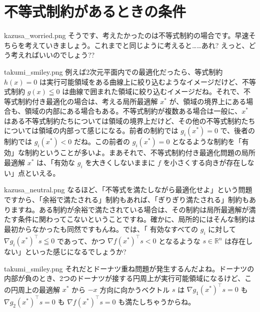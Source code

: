 \documentclass[b5paper,xelatex,ja=standard,10pt]{bxjsarticle}
\begin{document}
\renewcommand*{\mysectiontitle}{不等式制約があるときの条件}
\section*{\mysectiontitle}
\addcontentsline{toc}{section}{\mysectiontitle}
\vspace{3pt}

\begin{SERIFU}[colback=PaleIris, colbacktitle=PaleIris2]{kazusa_worried.png}
そうです、考えたかったのは不等式制約の場合です。早速そちらを考えていきましょう。これまでと同じように考えると……あれ? えっと、どう考えればいいのでしょう??
\end{SERIFU}

\begin{SERIFU}[colback=PaleGold, colbacktitle=PaleGold2]{takumi_smiley.png}
例えば2次元平面内での最適化だったら、等式制約 $h(x)=0$ は実行可能領域をある曲線上に絞り込むようなイメージだけど、不等式制約 $g(x) \leqq 0$ は曲線で囲まれた領域に絞り込むイメージだね。それで、不等式制約付き最適化の場合は、考える局所最適解 $x^\ast$ が、領域の境界上にある場合も、領域の内部にある場合もある。不等式制約が複数ある場合は一般に、$x^\ast$ はある不等式制約たちについては領域の境界上だけど、その他の不等式制約たちについては領域の内部って感じになる。前者の制約では $g_i(x^\ast) = 0$ で、後者の制約では $g_i(x^\ast) < 0$ だね。この前者の $g_i(x^\ast) = 0$ となるような制約を「有効」な制約ということが多いよ。まあそれで、不等式制約付き最適化問題の局所最適解 $x^\ast$ は、「有効な $g_i$ を大きくしないままに $f$ を小さくする向きが存在しない」点といえる。
\end{SERIFU}

\begin{SERIFU}[colback=PaleIris, colbacktitle=PaleIris2]{kazusa_neutral.png}
なるほど、「不等式を満たしながら最適化せよ」という問題ですから、「余裕で満たされる」制約もあれば、「ぎりぎり満たされる」制約もありますね。ある制約が余裕で満たされている場合は、その制約は局所最適解が満たす条件に関わってこないということですね。確かに、局所的にはそんな制約は最初からなかったも同然ですもんね。では、「 有効なすべての $g_i$ に対して $\nabla g_i(x^\ast)^\top s \leqq 0$ であって、かつ $\nabla f(x^\ast)^\top s < 0$ となるような $s \in \mathbb{R}^n$ は存在しない」といった感じになるでしょうか?
\end{SERIFU}

\begin{SERIFU}[colback=PaleGold, colbacktitle=PaleGold2]{takumi_smiley.png}
それだとドーナツ重ね問題が発生するんだよね。ドーナツの内部が負のとき、2つのドーナツが接する円周上が実行可能領域になるけど、この円周上の最適解 $x^\ast$ から $-x$ 方向に向かうベクトル $s$ は $\nabla g_1(x^\ast)^\top s = 0$ も $\nabla g_2(x^\ast)^\top s = 0$ も $\nabla f(x^\ast)^\top s = 0$ も満たしちゃうからね。
\end{SERIFU}
\end{document}
